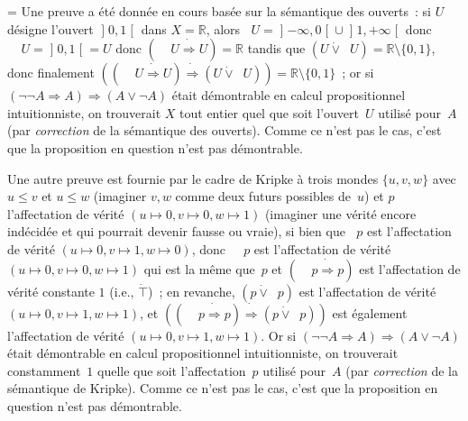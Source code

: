 \documentclass[12pt,a4paper]{article}
\theoremstyle{definition}
\newcommand{\dottedlimp}{\mathbin{\dot\Rightarrow}}
\newcommand{\dottedlor}{\mathbin{\dot\lor}}
\newcommand{\dottedtop}{\mathord{\dot\top}}
\newcommand{\dottedneg}{\mathop{\dot\neg}}
\newif\ifcorrige
\newenvironment{corrige}%
{\ifcorrige\relax\else\setbox0=\vbox\bgroup\fi%
\smallbreak\footnotesize\noindent{\underbar{\textit{Corrigé.}}\quad}}
{{\hbox{}\nobreak\hfill\checkmark}%
\ifcorrige\relax\else\egroup\fi\par}
\begin{document}
\begin{corrige}
Une preuve a été donnée en cours basée sur la sémantique des ouverts :
si $U$ désigne l'ouvert $\mathopen{]}0,1\mathclose{[}$ dans $X =
    \mathbb{R}$, alors $\dottedneg U =
    \mathopen{]}-\infty,0\mathclose{[} \cup
    \mathopen{]}1,+\infty\mathclose{[}$ donc $\dottedneg\dottedneg U =
    \mathopen{]}0,1\mathclose{[} = U$ donc $(\dottedneg\dottedneg U
    \dottedlimp U) = \mathbb{R}$ tandis que $(U \dottedlor \dottedneg
    U) = \mathbb{R}\setminus\{0,1\}$, donc finalement
    $((\dottedneg\dottedneg U \dottedlimp U) \dottedlimp (U \dottedlor
    \dottedneg U)) = \mathbb{R}\setminus\{0,1\}$ ; or si $(\neg\neg A
    \Rightarrow A) \Rightarrow (A \lor \neg A)$ était démontrable en
    calcul propositionnel intuitionniste, on trouverait $X$ tout
    entier quel que soit l'ouvert $U$ utilisé pour $A$ (par
    \emph{correction} de la sémantique des ouverts).  Comme ce n'est
    pas le cas, c'est que la proposition en question n'est pas
    démontrable.

Une autre preuve est fournie par le cadre de Kripke à trois mondes
$\{u,v,w\}$ avec $u\leq v$ et $u\leq w$ (imaginer $v,w$ comme deux
futurs possibles de $u$) et $p$ l'affectation de vérité $(u \mapsto 0,
v\mapsto 0, w\mapsto 1)$ (imaginer une vérité encore indécidée et qui
pourrait devenir fausse ou vraie), si bien que $\dottedneg p$ est
l'affectation de vérité $(u \mapsto 0, v\mapsto 1, w\mapsto 0)$, donc
$\dottedneg\dottedneg p$ est l'affectation de vérité $(u \mapsto 0,
v\mapsto 0, w\mapsto 1)$ qui est la même que $p$ et
$(\dottedneg\dottedneg p \dottedlimp p)$ est l'affectation de vérité
constante $1$ (i.e., $\dottedtop$) ; en revanche, $(p \dottedlor
\dottedneg p)$ est l'affectation de vérité $(u \mapsto 0, v\mapsto 1,
w\mapsto 1)$, et $((\dottedneg\dottedneg p \dottedlimp p) \dottedlimp
(p \dottedlor \dottedneg p))$ est également l'affectation de vérité
$(u \mapsto 0, v\mapsto 1, w\mapsto 1)$.  Or si $(\neg\neg A
\Rightarrow A) \Rightarrow (A \lor \neg A)$ était démontrable en
calcul propositionnel intuitionniste, on trouverait constamment $1$
quelle que soit l'affectation $p$ utilisé pour $A$ (par
\emph{correction} de la sémantique de Kripke).  Comme ce n'est pas
le cas, c'est que la proposition en question n'est pas démontrable.


\end{corrige}
\end{document}
